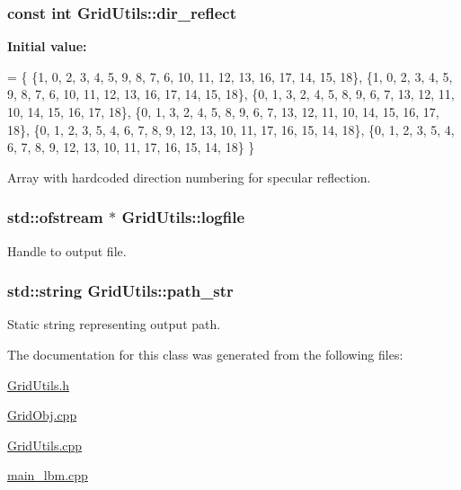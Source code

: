 \subsubsection[{\texorpdfstring{dir\+\_\+reflect}{dir_reflect}}]{\setlength{\rightskip}{0pt plus 5cm}const int Grid\+Utils\+::dir\+\_\+reflect\hspace{0.3cm}{\ttfamily [static]}}\hypertarget{class_grid_utils_a609ef43c9476067a52ee238cd3d594f2}{}\label{class_grid_utils_a609ef43c9476067a52ee238cd3d594f2}
{\bfseries Initial value\+:}
\begin{DoxyCode}
= 
    \{
        \{1, 0, 2, 3, 4, 5, 9, 8, 7, 6, 10, 11, 12, 13, 16, 17, 14, 15, 18\}, 
        \{1, 0, 2, 3, 4, 5, 9, 8, 7, 6, 10, 11, 12, 13, 16, 17, 14, 15, 18\},
        \{0, 1, 3, 2, 4, 5, 8, 9, 6, 7, 13, 12, 11, 10, 14, 15, 16, 17, 18\},
        \{0, 1, 3, 2, 4, 5, 8, 9, 6, 7, 13, 12, 11, 10, 14, 15, 16, 17, 18\},
        \{0, 1, 2, 3, 5, 4, 6, 7, 8, 9, 12, 13, 10, 11, 17, 16, 15, 14, 18\},
        \{0, 1, 2, 3, 5, 4, 6, 7, 8, 9, 12, 13, 10, 11, 17, 16, 15, 14, 18\}
    \}
\end{DoxyCode}


Array with hardcoded direction numbering for specular reflection. 

\subsubsection[{\texorpdfstring{logfile}{logfile}}]{\setlength{\rightskip}{0pt plus 5cm}std\+::ofstream $\ast$ Grid\+Utils\+::logfile\hspace{0.3cm}{\ttfamily [static]}}\hypertarget{class_grid_utils_a298239096e929c1ba4eba925e351c1b3}{}\label{class_grid_utils_a298239096e929c1ba4eba925e351c1b3}


Handle to output file. 

\subsubsection[{\texorpdfstring{path\+\_\+str}{path_str}}]{\setlength{\rightskip}{0pt plus 5cm}std\+::string Grid\+Utils\+::path\+\_\+str\hspace{0.3cm}{\ttfamily [static]}}\hypertarget{class_grid_utils_a9b58748e9e05e84852962d7abc7942e3}{}\label{class_grid_utils_a9b58748e9e05e84852962d7abc7942e3}


Static string representing output path. 



The documentation for this class was generated from the following files\+:\begin{DoxyCompactItemize}
\item 
\hyperlink{_grid_utils_8h}{Grid\+Utils.\+h}\item 
\hyperlink{_grid_obj_8cpp}{Grid\+Obj.\+cpp}\item 
\hyperlink{_grid_utils_8cpp}{Grid\+Utils.\+cpp}\item 
\hyperlink{main__lbm_8cpp}{main\+\_\+lbm.\+cpp}\end{DoxyCompactItemize}
